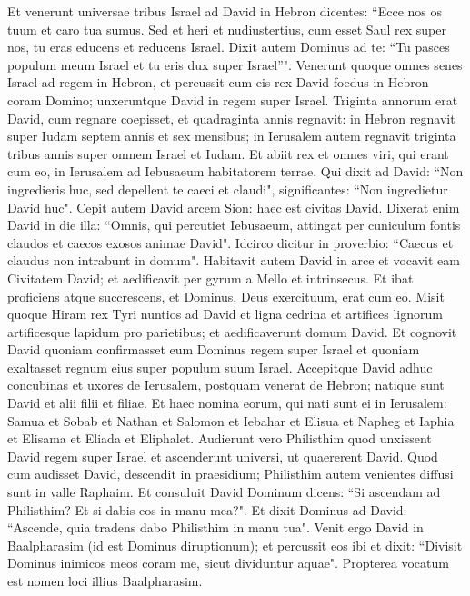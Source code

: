 \begin{biblechapter}  
\verse Et venerunt universae tribus Israel ad David in Hebron dicentes: “Ecce nos os tuum et caro tua sumus. 
\verse Sed et heri et nudiustertius, cum esset Saul rex super nos, tu eras educens et reducens Israel. Dixit autem Dominus ad te: “Tu pasces populum meum Israel et tu eris dux super Israel”". 
\verse Venerunt quoque omnes senes Israel ad regem in Hebron, et percussit cum eis rex David foedus in Hebron coram Domino; unxeruntque David in regem super Israel.  
\verse Triginta annorum erat David, cum regnare coepisset, et quadraginta annis regnavit: 
\verse in Hebron regnavit super Iudam septem annis et sex mensibus; in Ierusalem autem regnavit triginta tribus annis super omnem Israel et Iudam. 
\verse Et abiit rex et omnes viri, qui erant cum eo, in Ierusalem ad Iebusaeum habitatorem terrae. Qui dixit ad David: “Non ingredieris huc, sed depellent te caeci et claudi", significantes: “Non ingredietur David huc". 
\verse Cepit autem David arcem Sion: haec est civitas David. 
\verse Dixerat enim David in die illa: “Omnis, qui percutiet Iebusaeum, attingat per cuniculum fontis claudos et caecos exosos animae David". Idcirco dicitur in proverbio: “Caecus et claudus non intrabunt in domum". 
\verse Habitavit autem David in arce et vocavit eam Civitatem David; et aedificavit per gyrum a Mello et intrinsecus. 
\verse Et ibat proficiens atque succrescens, et Dominus, Deus exercituum, erat cum eo. 
\verse Misit quoque Hiram rex Tyri nuntios ad David et ligna cedrina et artifices lignorum artificesque lapidum pro parietibus; et aedificaverunt domum David.  
\verse Et cognovit David quoniam confirmasset eum Dominus regem super Israel et quoniam exaltasset regnum eius super populum suum Israel. 
\verse Accepitque David adhuc concubinas et uxores de Ierusalem, postquam venerat de Hebron; natique sunt David et alii filii et filiae. 
\verse Et haec nomina eorum, qui nati sunt ei in Ierusalem: Samua et Sobab et Nathan et Salomon 
\verse et Iebahar et Elisua et Napheg 
\verse et Iaphia et Elisama et Eliada et Eliphalet. 
\verse Audierunt vero Philisthim quod unxissent David regem super Israel et ascenderunt universi, ut quaererent David. Quod cum audisset David, descendit in praesidium; 
\verse Philisthim autem venientes diffusi sunt in valle Raphaim.  
\verse Et consuluit David Dominum dicens: “Si ascendam ad Philisthim? Et si dabis eos in manu mea?". Et dixit Dominus ad David: “Ascende, quia tradens dabo Philisthim in manu tua". 
\verse Venit ergo David in Baalpharasim (id est Dominus diruptionum); et percussit eos ibi et dixit: “Divisit Dominus inimicos meos coram me, sicut dividuntur aquae". Propterea vocatum est nomen loci illius Baalpharasim. 

\end{biblechapter}
